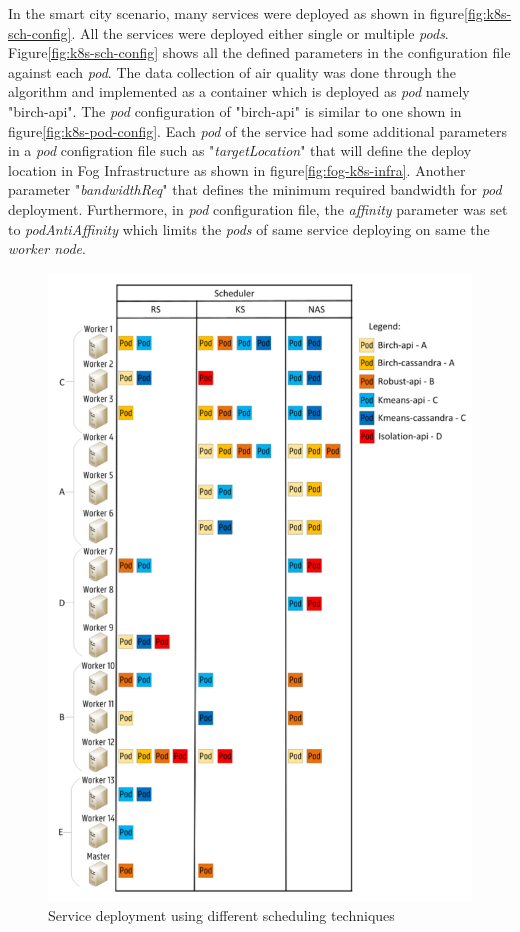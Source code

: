 In the smart city scenario, many services were deployed as shown in figure\ref{fig:k8s-sch-config}. All the services were deployed either single or multiple \emph{pods}. Figure\ref{fig:k8s-sch-config} shows all the defined parameters in the configuration file against each \emph{pod}. The data collection of air quality was done through the algorithm and implemented as a container which is deployed as \emph{pod} namely "birch-api"\cite{Santos2019}. The \emph{pod} configuration of "birch-api" is similar to one shown in figure\ref{fig:k8s-pod-config}. Each \emph{pod} of the service  had some additional parameters in a \emph{pod} configration file such as "\emph{targetLocation}" that will define the deploy location in Fog Infrastructure as shown in figure\ref{fig:fog-k8s-infra}\cite{Santos2019}. Another parameter "\emph{bandwidthReq}" that defines the minimum required bandwidth for \emph{pod} deployment\cite{Santos2019}. Furthermore, in \emph{pod} configuration file, the \emph{affinity} parameter was set to \emph{podAntiAffinity} which limits the \emph{pods} of same service deploying on same the \emph{worker node}\cite{Santos2019}.
\begin{figure}
  \centering
  \includegraphics[width=\linewidth]{figures/mlcn-k8s-service-prov.pdf}
  \caption{Service deployment using different scheduling techniques\cite{Santos2019}}
  \label{fig:k8s-service}
\end{figure}
